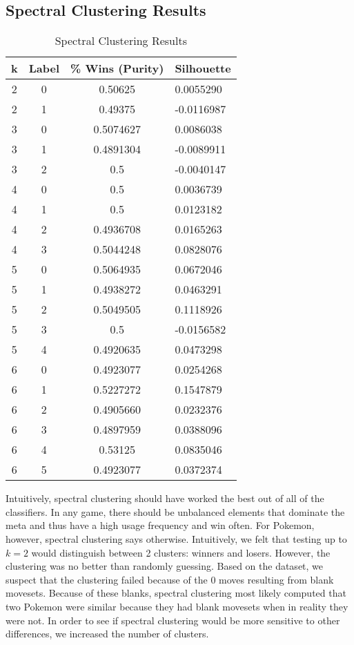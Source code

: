 \documentclass{acm_proc_article-sp}
\begin{document}
\subsection{Spectral Clustering Results}

\begin{table}

\centering

\caption{Spectral Clustering Results}

\begin{tabular}{|c|c|c|l|} \hline

k & Label & \% Wins (Purity) & Silhouette \\ \hline
2 & 0 & 0.50625 & 0.0055290 \\ \hline
2 & 1 & 0.49375 & -0.0116987 \\ \hline
3 & 0 & 0.5074627 & 0.0086038 \\ \hline
3 & 1 & 0.4891304 & -0.0089911 \\ \hline
3 & 2 & 0.5 & -0.0040147 \\ \hline
4 & 0 & 0.5 & 0.0036739 \\ \hline
4 & 1 & 0.5 & 0.0123182 \\ \hline
4 & 2 & 0.4936708 & 0.0165263 \\ \hline
4 & 3 & 0.5044248 & 0.0828076 \\ \hline
5 & 0 & 0.5064935 & 0.0672046 \\ \hline
5 & 1 & 0.4938272 & 0.0463291 \\ \hline
5 & 2 & 0.5049505 & 0.1118926 \\ \hline
5 & 3 & 0.5 & -0.0156582 \\ \hline
5 & 4 & 0.4920635 & 0.0473298 \\ \hline
6 & 0 & 0.4923077 & 0.0254268 \\ \hline
6 & 1 & 0.5227272 & 0.1547879 \\ \hline
6 & 2 & 0.4905660 & 0.0232376 \\ \hline
6 & 3 & 0.4897959 & 0.0388096 \\ \hline
6 & 4 & 0.53125 & 0.0835046 \\ \hline
6 & 5 & 0.4923077 & 0.0372374 \\ \hline
\end{tabular}

\end{table}

Intuitively, spectral clustering should have worked the best out of all of the classifiers. In any game, there should be unbalanced elements that dominate the meta and thus have a high usage frequency and win often. For Pokemon, however, spectral clustering says otherwise. Intuitively, we felt that testing up to $k=2$ would distinguish between 2 clusters: winners and losers. However, the clustering was no better than randomly guessing. Based on the dataset, we suspect that the clustering failed because of the 0 moves resulting from blank movesets. Because of these blanks, spectral clustering most likely computed that two Pokemon were similar because they had blank movesets when in reality they were not. In order to see if spectral clustering would be more sensitive to other differences, we increased the number of clusters.
\end{document}
